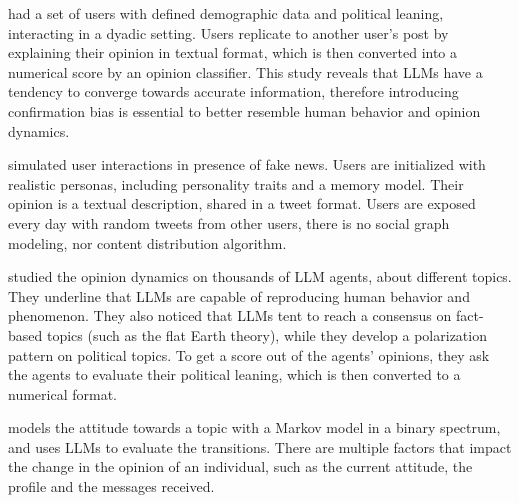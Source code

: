 \citet{chuang2024simulatingopiniondynamicsnetworks} had a set of users with defined demographic data and political leaning, interacting in a dyadic setting. Users replicate to another user's post by explaining their opinion in textual format, which is then converted into a numerical score by an opinion classifier.
This study reveals that LLMs have a tendency to converge towards accurate information, therefore introducing confirmation bias is essential to better resemble human behavior and opinion dynamics.

\citet{Liu_2024} simulated user interactions in presence of fake news. Users are initialized with realistic personas, including personality traits and a memory model. Their opinion is a textual description, shared in a tweet format. 
Users are exposed every day with random tweets from other users, there is no social graph modeling, nor content distribution algorithm.

\citet{piao2025emergencehumanlikepolarizationlarge} studied the opinion dynamics on thousands of LLM agents, about different topics. They underline that LLMs are capable of reproducing human behavior and phenomenon. They also noticed that LLMs tent to reach a consensus on fact-based topics (such as the flat Earth theory), while they develop a polarization pattern on political topics.
To get a score out of the agents' opinions, they ask the agents to evaluate their political leaning, which is then converted to a numerical format.

\citet{gao2023s3socialnetworksimulationlarge} models the attitude towards a topic with a Markov model in a binary spectrum, and uses LLMs to evaluate the transitions. There are multiple factors that impact the change in the opinion of an individual, such as the current attitude, the profile and the messages received.


